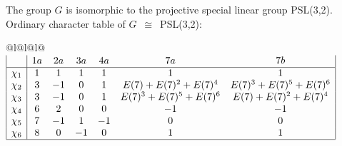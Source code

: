 \documentclass[varwidth=\maxdimen,border=10]{standalone}
\begin{document}
The group $G$ is isomorphic to the projective special linear group PSL(3,2).\\
Ordinary character table of $G$\ $\cong$\ PSL(3,2):\\
\begin{center}
\begin{tabular}{@{}l@{}l@{}l@{}}
\hline
\(\begin{array}{|l|cccccc|}
  & 1a & 2a & 3a & 4a & 7a & 7b\\ \hline
\chi_{1} & 1 & 1 & 1 & 1 & 1 & 1\\
\chi_{2} & 3 & -1 & 0 & 1 & E(7)+E(7)^{2}+E(7)^{4} & E(7)^{3}+E(7)^{5}+E(7)^{6}\\
\chi_{3} & 3 & -1 & 0 & 1 & E(7)^{3}+E(7)^{5}+E(7)^{6} & E(7)+E(7)^{2}+E(7)^{4}\\
\chi_{4} & 6 & 2 & 0 & 0 & -1 & -1\\
\chi_{5} & 7 & -1 & 1 & -1 & 0 & 0\\
\chi_{6} & 8 & 0 & -1 & 0 & 1 & 1\\
\hline
\end{array}\)\\
\end{tabular}
\end{center}
\end{document}

